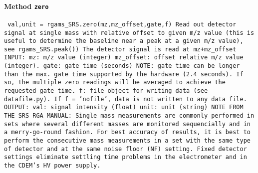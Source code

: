 \paragraph{Method \texttt{zero}}
\vspace{1ex}
\texttt{\newline
val,unit = rgams_SRS.zero(mz,mz_offset,gate,f)\newline
\newline
Read out detector signal at single mass with relative offset to given m/z value (this is useful to determine the baseline near a peak at a given m/z value), see rgams_SRS.peak())\newline
The detector signal is read at mz+mz_offset\newline
\newline
INPUT:\newline
mz: m/z value (integer)\newline
mz_offset: offset relative m/z value (integer).\newline
gate: gate time (seconds) NOTE: gate time can be longer than the max. gate time supported by the hardware (2.4 seconds). If so, the multiple zero readings will be averaged to achieve the requested gate time.\newline
f: file object for writing data (see datafile.py). If f = 'nofile', data is not written to any data file.\newline
\newline
OUTPUT:\newline
val: signal intensity (float)\newline
unit: unit (string)\newline
\newline
NOTE FROM THE SRS RGA MANUAL:\newline
Single mass measurements are commonly performed in sets\newline
where several different masses are monitored sequencially\newline
and in a merry-go-round fashion.\newline
For best accuracy of results, it is best to perform the consecutive\newline
mass measurements in a set with the same type of detector\newline
and at the same noise floor (NF) setting.\newline
Fixed detector settings eliminate settling time problems\newline
in the electrometer and in the CDEM's HV power supply.\newline
\newline
}

